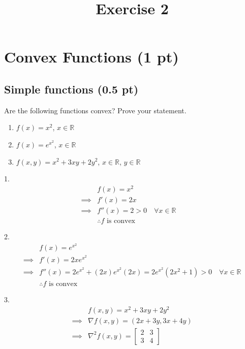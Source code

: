 \documentclass{article}
\title{Exercise 2}
\author{}
\date{}
\begin{document}
\maketitle

\section*{Convex Functions (1 pt)}

\subsection*{Simple functions (0.5 pt)}

Are the following functions convex? Prove your statement.

\begin{enumerate}
    \item $f(x) = x^2$, $x \in \mathbb{R}$
    \item $f(x) = e^{x^2}$, $x \in \mathbb{R}$
    \item $f(x, y) = x^2 + 3xy + 2y^2$, $x \in \mathbb{R}$, $y \in \mathbb{R}$
\end{enumerate}

1.
\begin{align*}
             & f(x) = x^2                                          \\
    \implies & f'(x) = 2x                                          \\
    \implies & f''(x) = 2 > 0 \quad \forall x \in \mathbb{R} \quad \\
             & \therefore \text{$f$ is convex}
\end{align*}

2.
\begin{align*}
             & f(x) = e^{x^2}                                                                                   \\
    \implies & f'(x) = 2x e^{x^2}                                                                               \\
    \implies & f''(x) = 2 e^{x^2} + (2x) e^{x^2} (2x) = 2 e^{x^2} (2x^2 + 1) > 0 \quad \forall x \in \mathbb{R} \\
             & \therefore \text{$f$ is convex}
\end{align*}

3.
\begin{align*}
             & f(x, y) = x^2 + 3xy + 2y^2          \\
    \implies & \nabla f(x, y) = (2x + 3y, 3x + 4y) \\
    \implies & \nabla^2 f(x, y) =
    \begin{bmatrix}
        2 & 3 \\
        3 & 4
    \end{bmatrix}
\end{align*}
\end{document}
